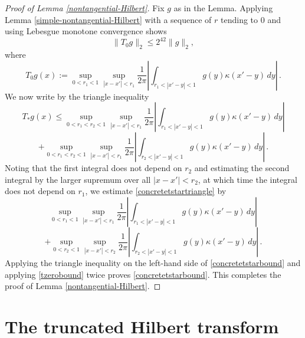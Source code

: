 {\begin{proof}[Proof of Lemma \ref{nontangential-Hilbert}]

Fix $g$ as in the Lemma.
Applying Lemma \ref{simple-nontangential-Hilbert} with a
sequence of $r$ tending to $0$ and using Lebesgue monotone convergence shows
\begin{equation}\label{tzerobound}
    \|T_{0}g\|_2\le 2^{42}\|g\|_2,
\end{equation}
where
\begin{equation}\label{eq-simpler--nontangential}
    T_{0} g(x):=\sup_{0<r_1<1}\sup_{|x-x'|<r_1}\frac 1{2\pi} \left|\int_{r_1<|x'-y|<1}
g(y) \kappa(x'-y)\, dy\right|\, .
\end{equation}
We now write by the triangle inequality
\begin{equation}\label{concretetstartriangle}
    T_* g(x)\le \sup_{0<r_1<r_2<1}\sup_{|x-x'|<r_1}\frac 1{2\pi} \left|\int_{r_1<|x'-y|<1}g(y) \kappa(x'-y)\, dy\right|
\end{equation}
    \begin{equation*}
+\sup_{0<r_1< r_2<1}\sup_{|x-x'|<r_1}\frac 1{2\pi} \left|\int_{r_2<|x'-y|<1}        g(y) \kappa(x'-y)\, dy\right|\, .
\end{equation*}
Noting that the first integral does not depend on $r_2$ and
estimating the second integral by the larger supremum over all
$|x-x'|<r_2$, at which time the integral does not depend on $r_1$, we estimate \eqref{concretetstartriangle} by
\begin{equation}\label{concretetstartriangle2}
   \sup_{0<r_1<1}\sup_{|x-x'|<r_1}\frac 1{2\pi} \left|\int_{r_1<|x'-y|<1}g(y) \kappa(x'-y)\, dy\right|
\end{equation}
    \begin{equation*}
+\sup_{0< r_2<1}\sup_{|x-x'|<r_2}\frac 1{2\pi} \left|\int_{r_2<|x'-y|<1}        g(y) \kappa(x'-y)\, dy\right|\, .
\end{equation*}
    Applying the triangle inequality on the left-hand side
    of \eqref{concretetstarbound} and applying
     \eqref{tzerobound} twice
    proves \eqref{concretetstarbound}.
    This completes the proof of Lemma \ref{nontangential-Hilbert}.
\end{proof}





\section{The truncated Hilbert transform}
\label{10hilbert}





}
